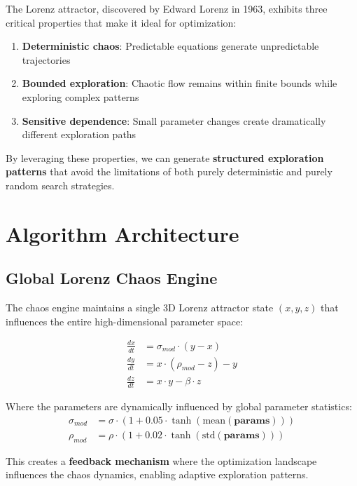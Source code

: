 \documentclass[11pt,a4paper]{article}
\begin{document}
The Lorenz attractor, discovered by Edward Lorenz in 1963, exhibits three critical properties that make it ideal for optimization:

\begin{enumerate}
\item \textbf{Deterministic chaos}: Predictable equations generate unpredictable trajectories
\item \textbf{Bounded exploration}: Chaotic flow remains within finite bounds while exploring complex patterns
\item \textbf{Sensitive dependence}: Small parameter changes create dramatically different exploration paths
\end{enumerate}

By leveraging these properties, we can generate \textbf{structured exploration patterns} that avoid the limitations of both purely deterministic and purely random search strategies.

\section{Algorithm Architecture}

\subsection{Global Lorenz Chaos Engine}

The chaos engine maintains a single 3D Lorenz attractor state $(x, y, z)$ that influences the entire high-dimensional parameter space:

\begin{align}
\frac{dx}{dt} &= \sigma_{mod} \cdot (y - x) \\
\frac{dy}{dt} &= x \cdot (\rho_{mod} - z) - y \\
\frac{dz}{dt} &= x \cdot y - \beta \cdot z
\end{align}

Where the parameters are dynamically influenced by global parameter statistics:
\begin{align}
\sigma_{mod} &= \sigma \cdot (1 + 0.05 \cdot \tanh(\text{mean}(\mathbf{params}))) \\
\rho_{mod} &= \rho \cdot (1 + 0.02 \cdot \tanh(\text{std}(\mathbf{params})))
\end{align}

This creates a \textbf{feedback mechanism} where the optimization landscape influences the chaos dynamics, enabling adaptive exploration patterns.
\end{document}

